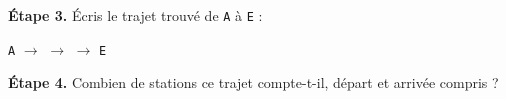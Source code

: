 \bigskip

\textbf{Étape 3.} Écris le trajet trouvé de \texttt{A} à \texttt{E} :

\medskip
\texttt{A} $\rightarrow$ \dotfill $\rightarrow$ \dotfill $\rightarrow$ \texttt{E}

\bigskip

\textbf{Étape 4.} Combien de stations ce trajet compte-t-il, départ et arrivée
compris ?

\medskip
\begin{center}
 \qquad {} \qquad {}
\end{center}
